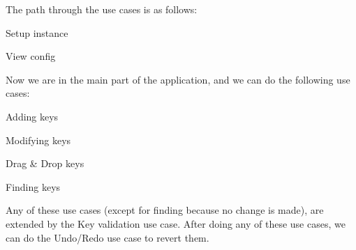 \label{doc_usecases_elektra_web_README_md_md_doc_usecases_elektra_web_README}%
%
 The path through the use cases is as follows\+:


\begin{DoxyItemize}
\item Setup instance
\item View config
\end{DoxyItemize}

Now we are in the main part of the application, and we can do the following use cases\+:


\begin{DoxyItemize}
\item Adding keys
\item Modifying keys
\item Drag \& Drop keys
\item Finding keys
\end{DoxyItemize}

Any of these use cases (except for finding because no change is made), are extended by the Key validation use case. After doing any of these use cases, we can do the Undo/\+Redo use case to revert them. 